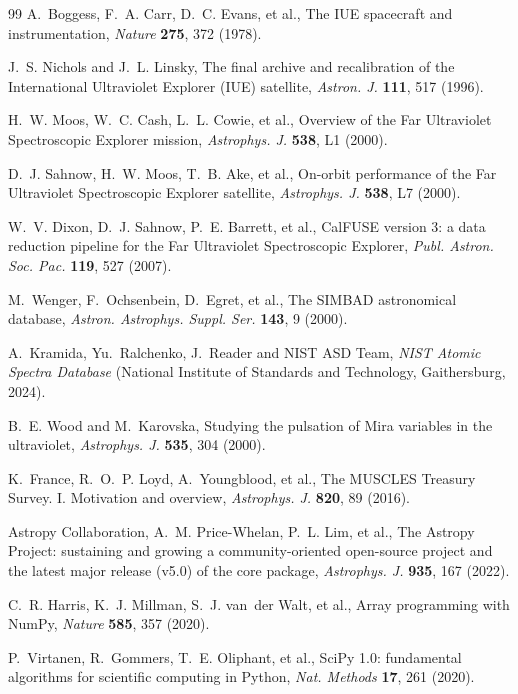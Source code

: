 \documentclass[3p,11pt]{elsarticle}
\begin{document}
\begin{thebibliography}{99}
A.~Boggess, F.~A. Carr, D.~C. Evans, et al., The IUE spacecraft and instrumentation,
\emph{Nature} \textbf{275}, 372 (1978).

J.~S. Nichols and J.~L. Linsky, The final archive and recalibration of the
International Ultraviolet Explorer (IUE) satellite, \emph{Astron. J.} \textbf{111}, 517
(1996).

H.~W. Moos, W.~C. Cash, L.~L. Cowie, et al., Overview of the Far Ultraviolet
Spectroscopic Explorer mission, \emph{Astrophys. J.} \textbf{538}, L1 (2000).

D.~J. Sahnow, H.~W. Moos, T.~B. Ake, et al., On-orbit performance of the Far
Ultraviolet Spectroscopic Explorer satellite, \emph{Astrophys. J.} \textbf{538}, L7
(2000).

W.~V. Dixon, D.~J. Sahnow, P.~E. Barrett, et al., CalFUSE version 3: a data reduction
pipeline for the Far Ultraviolet Spectroscopic Explorer, \emph{Publ. Astron. Soc. Pac.}
\textbf{119}, 527 (2007).

M.~Wenger, F.~Ochsenbein, D.~Egret, et al., The SIMBAD astronomical database,
\emph{Astron. Astrophys. Suppl. Ser.} \textbf{143}, 9 (2000).

A.~Kramida, Yu.~Ralchenko, J.~Reader and NIST ASD Team, \emph{NIST Atomic Spectra
Database} (National Institute of Standards and Technology, Gaithersburg, 2024).

B.~E. Wood and M.~Karovska, Studying the pulsation of Mira variables in the
ultraviolet, \emph{Astrophys. J.} \textbf{535}, 304 (2000).

K.~France, R.~O.~P. Loyd, A.~Youngblood, et al., The MUSCLES Treasury Survey. I.
Motivation and overview, \emph{Astrophys. J.} \textbf{820}, 89 (2016).

Astropy Collaboration, A.~M. Price-Whelan, P.~L. Lim, et al., The Astropy Project:
sustaining and growing a community-oriented open-source project and the latest major
release (v5.0) of the core package, \emph{Astrophys. J.} \textbf{935}, 167 (2022).

C.~R. Harris, K.~J. Millman, S.~J. van~der Walt, et al., Array programming with NumPy,
\emph{Nature} \textbf{585}, 357 (2020).

P.~Virtanen, R.~Gommers, T.~E. Oliphant, et al., SciPy 1.0: fundamental algorithms for
scientific computing in Python, \emph{Nat. Methods} \textbf{17}, 261 (2020).

\end{thebibliography}
\end{document}
